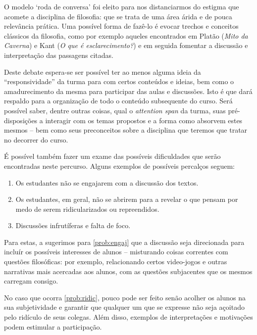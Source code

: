 \documentclass[12pt,a4paper]{article}
\begin{document}
	O modelo `roda de conversa' foi eleito 
	para nos distanciarmos do estigma que acomete a disciplina de filosofia:
	que se trata de uma área árida e de pouca relevância prática.
	Uma possível forma de fazê-lo é evocar trechos e conceitos 
	clássicos da filosofia, como por exemplo aqueles encontrados em 
	Platão (\textit{Mito da Caverna}) e Kant (\textit{O que é 
	esclarecimento?}) e em seguida fomentar a discussão e interpretação das 
	passagens citadas.

	Deste debate espera-se ser possível ter ao menos alguma ideia da 
	``responsividade'' da turma para com certos conteúdos e ideias, 
	bem como o amadurecimento da mesma para participar das aulas 
	e discussões. Isto é que dará respaldo para a organização de 
	todo o conteúdo subsequente do curso. Será possível saber, dentre 
	outras coisas, qual o \emph{attention span} da turma, suas 
	pré-disposições a interagir com os temas propostos e a forma 
	como absorvem estes mesmos -- bem como seus preconceitos sobre 
	a disciplina que teremos que tratar no decorrer do curso. 
	
	É possível também fazer um exame das possíveis dificuldades 
	que serão encontradas neste percurso. Alguns exemplos de possíveis 
	percalços seguem:

	\begin{enumerate}[label=\alph*)]
		\item	\label{prob:engaj} 
			Os estudantes não se engajarem com a discussão 
			dos textos.

		\item	\label{prob:ridic}
			Os estudantes, em geral, não se abrirem para a 
			revelar o que pensam por medo de serem ridicularizados
			ou repreendidos.

		\item	\label{prob:disc}
			Discussões infrutíferas e falta de foco.
	\end{enumerate}
	
	Para estas, a sugerimos para \ref{prob:engaj} que a discussão
	seja direcionada para incluír os possíveis interesses de alunos
	-- misturando coisas correntes com questões filosóficas: por
	exemplo, relacionando certos video-jogos e outras narrativas 
	mais acercadas aos alunos, com as questões subjacentes que os 
	mesmos carregam consigo. 
	
	No caso que ocorra \ref{prob:ridic}, pouco pode ser feito senão
	acolher os alunos na sua subjetividade e garantir que qualquer 
	um que se expresse não seja açoitado pelo ridículo de seus 
	colegas. Além disso, exemplos de interpretações e motivações 
	podem estimular a participação.
\end{document}
